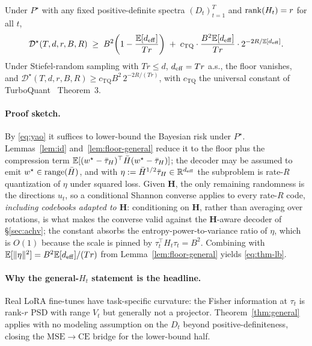 \begin{theorem}\label{thm:general}
Under $P^\star$ with any fixed positive-definite spectra
$(D_t)_{t=1}^T$ and $\operatorname{rank}(H_t) = r$ for all $t$,
\begin{equation}\label{eq:thm-lb}
  \mathcal{D}^\star(T, d, r, B, R)
  \;\geq\;
  B^2\!\left(1 - \frac{\mathbb{E}[d_{\mathrm{eff}}]}{Tr}\right)
  \;+\; c_{\mathrm{TQ}}\cdot\frac{B^2\mathbb{E}[d_{\mathrm{eff}}]}{Tr}
  \cdot 2^{-2R/\mathbb{E}[d_{\mathrm{eff}}]}.
\end{equation}
Under Stiefel-random sampling with $Tr\leq d$, $d_{\mathrm{eff}} = Tr$ a.s., the
floor vanishes, and
$\mathcal{D}^\star(T,d,r,B,R) \geq c_{\mathrm{TQ}} B^2\,
2^{-2R/(Tr)}$, with $c_{\mathrm{TQ}}$ the universal constant of
TurboQuant~\citep{zandieh2025turboquant} Theorem~3.
\end{theorem}

\paragraph{Proof sketch.} By \eqref{eq:yao} it suffices to lower-bound
the Bayesian risk under $P^\star$. Lemmas~\ref{lem:id}
and~\ref{lem:floor-general} reduce it to the floor plus the
compression term $\mathbb{E}[(w^\star-\bar{\tau}_H)^\top\bar H(w^\star-\bar{\tau}_H)]$; the
decoder may be assumed to emit $w^\star \in \operatorname{range}(\bar H)$, and with
$\eta := \bar H^{1/2}\bar{\tau}_H \in \mathbb{R}^{d_{\mathrm{eff}}}$ the subproblem is rate-$R$
quantization of $\eta$ under squared loss. Given $\boldsymbol H$, the
only remaining randomness is the directions $u_t$, so a conditional
Shannon converse applies to every rate-$R$ code, \emph{including
codebooks adapted to $\boldsymbol H$}: conditioning on
$\boldsymbol H$, rather than averaging over rotations, is what makes
the converse valid against the $\boldsymbol H$-aware decoder of
\S\ref{sec:achv}; the constant absorbs the entropy-power-to-variance
ratio of $\eta$, which is $O(1)$ because the scale is pinned by
$\tau_t^\top H_t \tau_t = B^2$. Combining with
$\mathbb{E}[\|\eta\|^2] = B^2\mathbb{E}[d_{\mathrm{eff}}]/(Tr)$ from
Lemma~\ref{lem:floor-general} yields \eqref{eq:thm-lb}.

\paragraph{Why the general-$H_t$ statement is the headline.} Real LoRA
fine-tunes have task-specific curvature: the Fisher information at
$\tau_t$ is rank-$r$ PSD with range $V_t$ but generally not a
projector. Theorem~\ref{thm:general} applies with no modeling
assumption on the $D_t$ beyond positive-definiteness, closing the
$\mathrm{MSE}\to\mathrm{CE}$ bridge for the lower-bound half.
